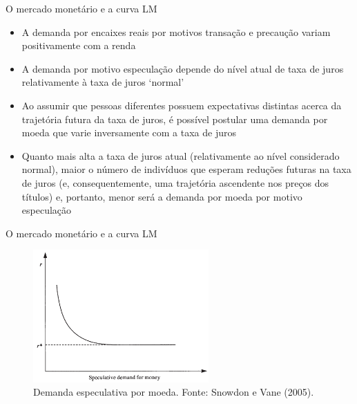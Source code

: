 \documentclass[10pt]{beamer}
\begin{document}
\begin{frame}{O mercado monetário e a curva LM}
    \begin{itemize}
        \item A demanda por encaixes reais por motivos transação e precaução variam positivamente com a renda
        \bigskip
        \item A demanda por motivo especulação depende do nível atual de taxa de juros relativamente à taxa de juros `normal'
        \bigskip
        \item Ao assumir que pessoas diferentes possuem expectativas distintas acerca da trajetória futura da taxa de juros, é possível postular uma demanda por moeda que varie inversamente com a taxa de juros
        \bigskip
        \item Quanto mais alta a taxa de juros atual (relativamente ao nível considerado normal), maior o número de indivíduos que esperam reduções futuras na taxa de juros (e, consequentemente, uma trajetória ascendente nos preços dos títulos) e, portanto, menor será a demanda por moeda por motivo especulação
    \end{itemize}
\end{frame}

\begin{frame}{O mercado monetário e a curva LM}
    \begin{figure}
        \centering
        \includegraphics[width=0.6\textwidth]{./figures/aula06_fig1.PNG}
        \caption{Demanda especulativa por moeda. Fonte: Snowdon e Vane (2005).}
        \label{fig1}
    \end{figure}
\end{frame}
\end{document}
